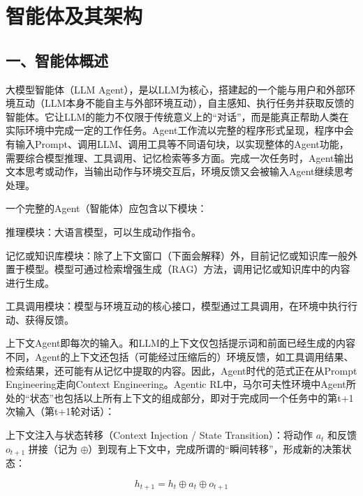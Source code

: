 \setcounter{section}{0}

\hypertarget{ux667aux80fdux4f53ux53caux5176ux67b6ux6784}{%
\section{智能体及其架构}\label{ux667aux80fdux4f53ux53caux5176ux67b6ux6784}}

\hypertarget{ux4e00ux667aux80fdux4f53ux6982ux8ff0}{%
\subsection{一、智能体概述}\label{ux4e00ux667aux80fdux4f53ux6982ux8ff0}}

大模型智能体（LLM Agent），是以LLM为核心，搭建起的一个能与用户和外部环境互动（LLM本身不能自主与外部环境互动），自主感知、执行任务并获取反馈的智能体。它让LLM的能力不仅限于传统意义上的``对话''，而是能真正帮助人类在实际环境中完成一定的工作任务。Agent工作流以完整的程序形式呈现，程序中会有输入Prompt、调用LLM、调用工具等不同语句块，以实现整体的Agent功能，需要综合模型推理、工具调用、记忆检索等多方面。完成一次任务时，Agent输出文本思考或动作，当输出动作与环境交互后，环境反馈又会被输入Agent继续思考处理。

一个完整的Agent（智能体）应包含以下模块：

推理模块：大语言模型，可以生成动作指令。

记忆或知识库模块：除了上下文窗口（下面会解释）外，目前记忆或知识库一般外置于模型。模型可通过检索增强生成（RAG）方法，调用记忆或知识库中的内容进行生成。

工具调用模块：模型与环境互动的核心接口，模型通过工具调用，在环境中执行行动、获得反馈。

上下文Agent即每次的输入。和LLM的上下文仅包括提示词和前面已经生成的内容不同，Agent的上下文还包括（可能经过压缩后的）环境反馈，如工具调用结果、检索结果，还可能有从记忆中提取的内容。因此，Agent时代的范式正在从Prompt Engineering走向Context Engineering。Agentic RL中，马尔可夫性环境中Agent所处的``状态''也包括以上所有上下文的组成部分，即对于完成同一个任务中的第t+1次输入（第t+1轮对话）：

上下文注入与状态转移（Context Injection / State Transition）：将动作 \(a_t\) 和反馈 \(o_{t+1}\) 拼接（记为 \(\oplus\)）到现有上下文中，完成所谓的``瞬间转移''，形成新的决策状态：

\[
h_{t+1}=h_t\oplus a_t\oplus o_{t+1}
\]

